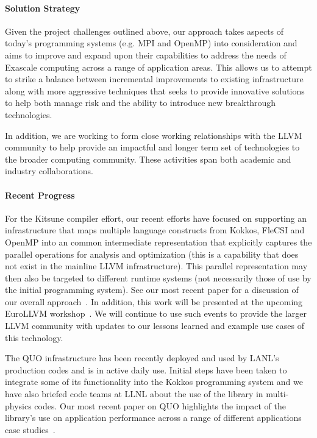 \paragraph{Solution Strategy}
Given the project challenges outlined above, our approach takes aspects of today's 
programming systems (e.g. MPI and OpenMP) into consideration and aims to improve and 
expand upon their capabilities to address the needs of Exascale computing across a range
of application areas.  This allows us to attempt to strike a balance between incremental
improvements to existing infrastructure along with more aggressive techniques that seeks 
to provide innovative solutions to help both manage risk and the ability to introduce 
new breakthrough technologies.  

In addition, we are working to form close working relationships with the LLVM community 
to help provide an impactful and longer term set of technologies to the broader computing
community.  These activities span both academic and industry collaborations. 

\paragraph{Recent Progress}
For the Kitsune compiler effort, our recent efforts have focused on supporting an 
infrastructure that maps multiple language constructs from Kokkos, FleCSI and OpenMP into 
an common intermediate representation that explicitly captures the parallel operations 
for analysis and optimization (this is a capability that does not exist in the mainline 
LLVM infrastructure).  This parallel representation may then also be targeted to different
runtime systems (not necessarily those of use by the initial programming system).  See
our most recent paper for a discussion of our overall approach~\cite{Stelle:2017}.  In 
addition, this work will be presented at the upcoming EuroLLVM 
workshop~\cite{EuroLLVM:2018}.  We will continue to use such events to provide the larger
LLVM community with updates to our lessons learned and example use cases of this 
technology. 

The QUO infrastructure has been recently deployed and used by LANL's production codes and
is in active daily use.  Initial steps have been taken to integrate some of its 
functionality into the Kokkos programming system and we have also briefed code teams at
LLNL about the use of the library in multi-physics codes.  Our most recent paper on QUO
highlights the impact of the library's use on application performance across a range of
different applications case studies~\cite{Gutierrez:2017}. 

